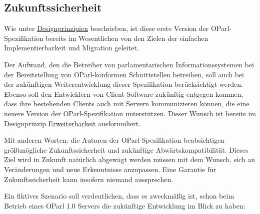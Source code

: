 \documentclass[,a4paper]{article}
\begin{document}
\subsection{Zukunftssicherheit}\label{zukunftssicherheit}

Wie unter \hyperref[designprinzipien]{Designprinzipien} beschrieben, ist
diese erste Version der OParl-Spezifikation bereits im Wesentlichen von
den Zielen der einfachen Implementierbarkeit und Migration geleitet.

Der Aufwand, den die Betreiber von parlamentarischen
Informationssystemen bei der Bereitstellung von OParl-konformen
Schnittstellen betreiben, soll auch bei der zukünftigen
Weiterentwicklung dieser Spezifikation berücksichtigt werden. Ebenso
soll den Entwicklern von Client-Software zukünftig entgegen kommen, dass
ihre bestehenden Clients auch mit Servern kommunizieren können, die eine
neuere Version der OParl-Spezifikation unterstützen. Dieser Wunsch ist
bereits im Designprinzip \hyperref[erweiterbarkeit]{Erweiterbarkeit}
ausformuliert.

Mit anderen Worten: die Autoren der OParl-Spezifikation beabsichtigen
größtmögliche Zukunftssicherheit und zukünftige Abwärtskompatibilität.
Dieses Ziel wird in Zukunft natürlich abgewägt werden müssen mit dem
Wunsch, sich an Veränderungen und neue Erkenntnisse anzupassen. Eine
Garantie für Zukunftssicherheit kann insofern niemand aussprechen.

Ein fiktives Szenario soll verdeutlichen, dass es zweckmäßig ist, schon
beim Betrieb eines OParl 1.0 Servers die zukünftige Entwicklung im Blick
zu haben:
\end{document}
